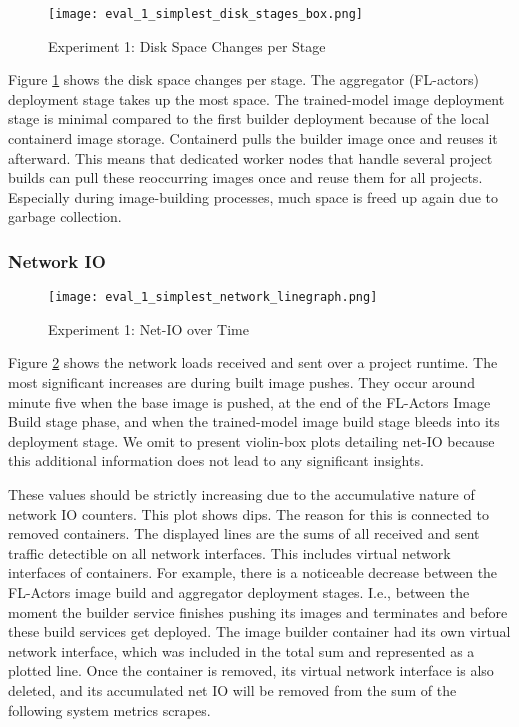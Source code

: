 \begin{figure}[h]
    \begin{adjustwidth}{-0.2\paperwidth}{-0.2\paperwidth}
        \centering
        \texttt{[image: eval\_1\_simplest\_disk\_stages\_box.png]}
        \caption{Experiment 1: Disk Space Changes per Stage}
        \label{fig:eval_1_simplest_disk_space_stages}
    \end{adjustwidth}
\end{figure}
Figure \ref{fig:eval_1_simplest_disk_space_stages} shows the disk space changes per stage.
The aggregator (FL-actors) deployment stage takes up the most space.
The trained-model image deployment stage is minimal compared to the first builder deployment because of the local containerd image storage.
Containerd pulls the builder image once and reuses it afterward.
This means that dedicated worker nodes that handle several project builds can pull these reoccurring images once and reuse them for all projects.
Especially during image-building processes, much space is freed up again due to garbage collection.

\subsubsection{Network IO}

\begin{figure}[h]
    \begin{adjustwidth}{-0.2\paperwidth}{-0.2\paperwidth}
        \centering
        \texttt{[image: eval\_1\_simplest\_network\_linegraph.png]}
        \caption{Experiment 1: Net-IO over Time}
        \label{fig:eval_1_simplest_net_io}
    \end{adjustwidth}
\end{figure}

Figure \ref{fig:eval_1_simplest_net_io} shows the network loads received and sent over a project runtime.
The most significant increases are during built image pushes.
They occur around minute five when the base image is pushed, at the end of the FL-Actors Image Build stage phase, and when the trained-model image build stage bleeds into its deployment stage.
We omit to present violin-box plots detailing net-IO because this additional information does not lead to any significant insights.

These values should be strictly increasing due to the accumulative nature of network IO counters.
This plot shows dips.
The reason for this is connected to removed containers.
The displayed lines are the sums of all received and sent traffic detectible on all network interfaces.
This includes virtual network interfaces of containers.
For example, there is a noticeable decrease between the FL-Actors image build and aggregator deployment stages.
I.e., between the moment the builder service finishes pushing its images and terminates and before these build services get deployed.
The image builder container had its own virtual network interface, which was included in the total sum and represented as a plotted line.
Once the container is removed, its virtual network interface is also deleted, and its accumulated net IO will be removed from the sum of the following system metrics scrapes.

